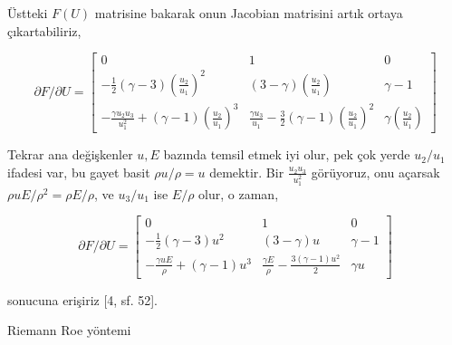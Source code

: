\documentclass[12pt,fleqn]{article}\usepackage{../../common}
\begin{document}
Üstteki $F(U)$ matrisine bakarak onun Jacobian matrisini artık ortaya çıkartabiliriz,

$$
\partial F / \partial U =
\left[\begin{array}{ccc}
0 &
1 &
0 \\
-\frac{1}{2} (\gamma - 3)(\frac{u_2}{u_1})^2 &
(3-\gamma)(\frac{u_2}{u_1}) &
\gamma-1
\\
- \frac{\gamma u_2 u_3}{u_1^2} + (\gamma-1)(\frac{u_2}{u_1})^3 &
\frac{\gamma u_3}{u_1} - \frac{3}{2} (\gamma-1)(\frac{u_2}{u_1})^2 &
\gamma (\frac{u_2}{u_1})
\end{array}\right]
$$

Tekrar ana değişkenler $u,E$ bazında temsil etmek iyi olur, pek çok yerde
$u_2/u_1$ ifadesi var, bu gayet basit $\rho u / \rho = u$ demektir. Bir
$\frac{u_2 u_3}{u_1^2}$ görüyoruz, onu açarsak $\rho u E / \rho^2 = \rho E / \rho$,
ve $u_3 / u_1$ ise $E / \rho$ olur, o zaman,

$$
\partial F / \partial U =
\left[\begin{array}{ccc}
0 &
1 &
0 \\
-\frac{1}{2} (\gamma - 3)u^2 &
(3-\gamma)u &
\gamma-1
\\
- \frac{\gamma u E}{\rho} + (\gamma-1)u^3 &
\frac{\gamma E}{\rho} - \frac{3 (\gamma-1)u^2}{2} &
\gamma u
\end{array}\right]
$$

sonucuna erişiriz [4, sf. 52].









Riemann Roe yöntemi 
\end{document}
